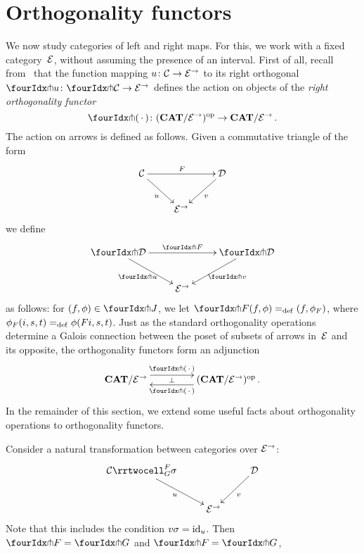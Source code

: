\documentclass[reqno,10pt,a4paper,oneside]{amsart}
\begin{document}
\section{Orthogonality functors} 

We now study categories of left and right maps. For this, we work with a fixed category~$\mathcal{E}$, without assuming the presence of an interval. First of all, recall from~\cite{garner:small-object-argument} that the function mapping $u \colon \mathcal{C} \to \mathcal{E}^\to$ to its right orthogonal $\liftr{u} \co \liftr{\cal{C}} \to \cal{E}^\to$ defines the action on objects of the \emph{right orthogonality functor}
\[
\liftr{\brarghole} \co  (\CAT/\catE^{\to})^{\op} \to \CAT/\catE^{\to} \, .
\]
The action  on arrows is defined as follows. Given a commutative triangle of the form
\[
\xymatrix{
\cal{C} \ar[dr]_u \ar[rr]^F & & \cal{D} \ar[dl]^{v} \\
 & \catE^\to }
 \]
we define 
\[
\xymatrix{
\liftr{\cal{D}} \ar[dr]_{\liftr{u}} \ar[rr]^{\liftr{F}} & & \liftr{\cal{D}} \ar[dl]^{\liftr{v}} \\
 & \catE^\to }
\]
as follows: for $(f, \phi) \in \liftr{J}$, we let $\liftr{F}(f,\phi) \defeq (f, \phi_F)$, where $\phi_F(i, s, t) =_{\operatorname{def}} \phi(Fi, s, t)$. 
Just as the standard orthogonality operations determine a Galois connection between the poset of subsets of arrows in~$\mathcal{E}$ and its opposite, the orthogonality functors form an adjunction 
\begin{equation}
\label{garner-adjunction}
\begin{gathered}
\xymatrix@C+2em{
  \CAT/\catE^{\to}
  \ar@<5pt>[r]^-{\liftl{\brarghole}}
  \ar@{}[r]|-{\bot}
&
  (\CAT/\catE^{\to})^{\op} \, .
  \ar@<5pt>[l]^-{\liftr{\brarghole}}
}
\end{gathered}
\end{equation}
In the remainder of this section, we extend some useful facts about orthogonality operations to orthogonality functors.






\begin{proposition}
Consider a natural transformation between categories over $\mathcal{E}^{\to}$:
\[
\xymatrix{
  \cal{C}
  \rrtwocell_G^F{\sigma}
 \ar[dr]_{u}
&&
  \cal{D}
  \ar[dl]^{v}
\\&
  \catE^{\to}
}
\]
Note that this includes the condition $v \sigma = \operatorname{id}_u$.
Then $\liftr{F} = \liftr{G}$ and $\liftl{F} = \liftl{G}$, 
\end{proposition}
\end{document}
